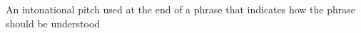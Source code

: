 An intonational pitch used at the end of a phrase that indicates how the phrase should be understood
